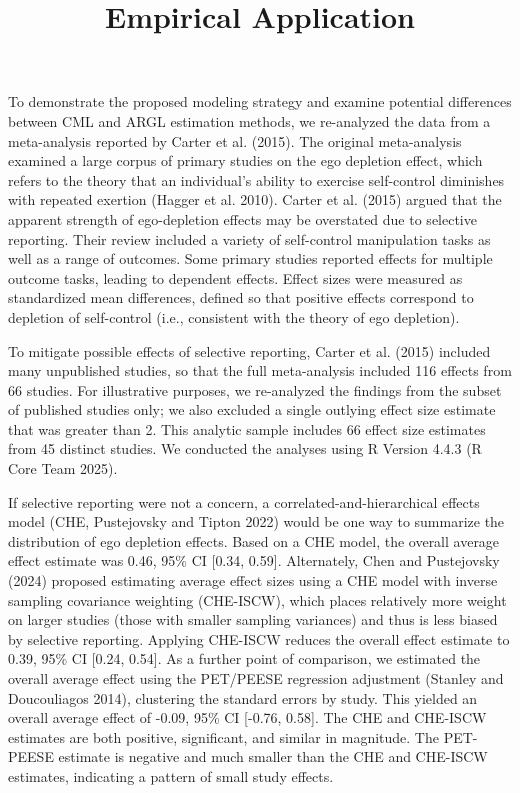 \documentclass[
]{article}
\title{Empirical Application}
\author{}
\date{\vspace{-2.5em}}
\begin{document}
\maketitle

To demonstrate the proposed modeling strategy and examine potential
differences between CML and ARGL estimation methods, we re-analyzed the
data from a meta-analysis reported by Carter et al. (2015). The original
meta-analysis examined a large corpus of primary studies on the ego
depletion effect, which refers to the theory that an individual's
ability to exercise self-control diminishes with repeated exertion
(Hagger et al. 2010). Carter et al. (2015) argued that the apparent
strength of ego-depletion effects may be overstated due to selective
reporting. Their review included a variety of self-control manipulation
tasks as well as a range of outcomes. Some primary studies reported
effects for multiple outcome tasks, leading to dependent effects. Effect
sizes were measured as standardized mean differences, defined so that
positive effects correspond to depletion of self-control (i.e.,
consistent with the theory of ego depletion).

To mitigate possible effects of selective reporting, Carter et al.
(2015) included many unpublished studies, so that the full meta-analysis
included 116 effects from 66 studies. For illustrative purposes, we
re-analyzed the findings from the subset of published studies only; we
also excluded a single outlying effect size estimate that was greater
than 2. This analytic sample includes 66 effect size estimates from 45
distinct studies. We conducted the analyses using R Version 4.4.3 (R
Core Team 2025).

If selective reporting were not a concern, a correlated-and-hierarchical
effects model (CHE, Pustejovsky and Tipton 2022) would be one way to
summarize the distribution of ego depletion effects. Based on a CHE
model, the overall average effect estimate was 0.46, 95\% CI {[}0.34,
0.59{]}. Alternately, Chen and Pustejovsky (2024) proposed estimating
average effect sizes using a CHE model with inverse sampling covariance
weighting (CHE-ISCW), which places relatively more weight on larger
studies (those with smaller sampling variances) and thus is less biased
by selective reporting. Applying CHE-ISCW reduces the overall effect
estimate to 0.39, 95\% CI {[}0.24, 0.54{]}. As a further point of
comparison, we estimated the overall average effect using the PET/PEESE
regression adjustment (Stanley and Doucouliagos 2014), clustering the
standard errors by study. This yielded an overall average effect of
-0.09, 95\% CI {[}-0.76, 0.58{]}. The CHE and CHE-ISCW estimates are
both positive, significant, and similar in magnitude. The PET-PEESE
estimate is negative and much smaller than the CHE and CHE-ISCW
estimates, indicating a pattern of small study effects.
\end{document}
